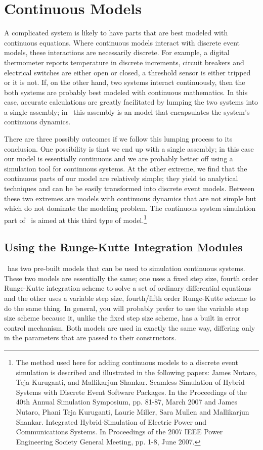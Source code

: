 \chapter{Continuous Models}
A complicated system is likely to have parts that are best modeled with continuous equations. Where continuous models interact with discrete event models, these interactions are necessarily discrete. For example, a digital thermometer reports temperature in discrete increments, circuit breakers and electrical switches are either open or closed, a threshold sensor is either tripped or it is not. If, on the other hand, two systems interact continuously, then the both systems are probably best modeled with continuous mathematics. In this case, accurate calculations are greatly facilitated by lumping the two systems into a single assembly; in \adevs\ this assembly is an  model that encapsulates the system's continuous dynamics.

There are three possibly outcomes if we follow this lumping process to its conclusion. One possibility is that we end up with a single assembly; in this case our model is essentially continuous and we are probably better off using a simulation tool for continuous systems. At the other extreme, we find that the continuous parts of our model are relatively simple; they yield to analytical techniques and can be be easily transformed into discrete event models. Between these two extremes are models with continuous dynamics that are not simple but which do not dominate the modeling problem. The continuous system simulation part of \adevs\ is aimed at this third type of model.\footnote{The method used here for adding continuous models to a discrete event simulation is described and illustrated in the following papers: James Nutaro, Teja Kuruganti, and Mallikarjun Shankar. Seamless Simulation of Hybrid Systems with Discrete Event Software Packages. In the Proceedings of the 40th Annual Simulation Symposium, pp. 81-87, March 2007 and James Nutaro, Phani Teja Kuruganti, Laurie Miller, Sara Mullen and Mallikarjun Shankar. Integrated Hybrid-Simulation of Electric Power and Communications Systems. In Proceedings of the 2007 IEEE Power Engineering Society General Meeting, pp. 1-8, June 2007.}

\section{Using the Runge-Kutte Integration Modules}
\adevs\ has two pre-built  models that can be used to simulation continuous systems. These two models are essentially the same; one uses a fixed step size, fourth order Runge-Kutte integration scheme to solve a set of ordinary differential equations and the other uses a variable step size, fourth/fifth order Runge-Kutte scheme to do the same thing. In general, you will probably prefer to use the variable step size scheme because it, unlike the fixed step size scheme, has a built in error control mechanism. Both models are used in exactly the same way, differing only in the parameters that are passed to their constructors.

